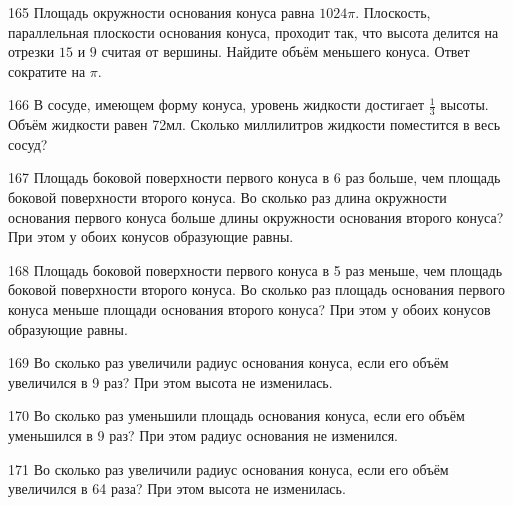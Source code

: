 \documentclass[a4paper]{article}
\begin{document}
\begin{taskBN}{165}
Площадь окружности основания конуса равна $1024\pi$. Плоскость, параллельная плоскости основания конуса,  проходит так, что высота делится на отрезки $15$ и $9$ считая от вершины. Найдите объём меньшего конуса. Ответ сократите на $\pi$.
\end{taskBN}

\begin{taskBN}{166}
В сосуде, имеющем форму конуса, уровень жидкости достигает $\frac{1}{3}$ высоты. Объём жидкости равен 72мл. Сколько миллилитров жидкости поместится в весь сосуд?
\end{taskBN}

\begin{taskBN}{167}
Площадь боковой поверхности первого конуса в 6 раз больше, чем площадь боковой поверхности второго конуса. Во сколько раз длина окружности основания первого конуса больше длины окружности основания второго конуса? При этом у обоих конусов образующие равны.
\end{taskBN}

\begin{taskBN}{168}
Площадь боковой поверхности первого конуса в 5 раз меньше, чем площадь боковой поверхности второго конуса. Во сколько раз площадь основания первого конуса меньше площади основания второго конуса? При этом у обоих конусов образующие равны.
\end{taskBN}

\begin{taskBN}{169}
Во сколько раз увеличили радиус основания конуса, если его объём увеличился в 9 раз? При этом высота не изменилась.
\end{taskBN}

\begin{taskBN}{170}
Во сколько раз уменьшили площадь основания конуса, если его объём уменьшился в 9 раз? При этом радиус основания не изменился.
\end{taskBN}

\begin{taskBN}{171}
Во сколько раз увеличили радиус основания конуса, если его объём увеличился в 64 раза? При этом высота не изменилась.
\end{taskBN}
\end{document}
